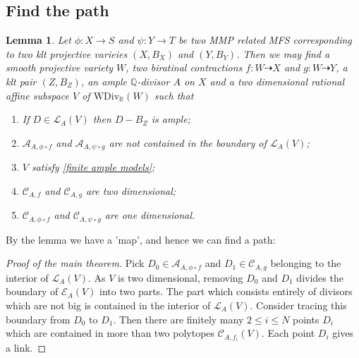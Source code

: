 \documentclass{article}
\newtheorem{lem}[defn]{Lemma}
\begin{document}
\subsection{Find the path}
\begin{lem}
	Let $ \phi:X\to S $ and $ \psi :Y\to T  $ be two MMP related MFS corresponding to two klt projective varieies $ (X,B_X) $ and $ (Y,B_Y) $. Then we may find a smooth projective variety $ W $, two biratinal contractions $ f:W\dashrightarrow X $ and $ g:W\dashrightarrow Y $, a klt pair $ (Z,B_Z) $, an ample $ \mathbb{Q} $-divisor $ A $ on $ X $ and a two dimensional rational affine subspace $ V $ of $ \mathrm{WDiv}_\mathbb{R}(W) $ such that 
	\begin{enumerate}[1)]
		\item If $ D\in \mathcal{L}_A(V) $ then $ D-B_Z $ is ample;
		\item $ \mathcal{A}_{A,\phi\circ f} $ and $ \mathcal{A}_{A,\psi\circ g} $ are not contained in the boundary of $ \mathcal{L}_A(V) $;
		\item $ V $ satisfy \ref{finite ample models};
		\item $ \mathcal{C}_{A,f} $ and $ \mathcal{C}_{A,g} $ are two dimensional;
		\item $ \mathcal{C}_{A,\phi\circ f} $ and $ \mathcal{C}_{A,\psi\circ g} $ are one dimensional.
	\end{enumerate}
\end{lem}

By the lemma we have a 'map', and hence we can find a path:

\begin{proof}[Proof of the main theorem]
	Pick $ D_0\in \mathcal{A}_{A,\phi\circ f} $  and $ D_1\in \mathcal{C}_{A,g} $ belonging to the interior of $ \mathcal{L}_A(V) $. As $ V $ is two dimensional, removing $ D_0 $ and $ D_1 $ divides the boundary of $ \mathcal{E}_A(V) $ into two parts. The part which consists entirely of divisors which are not big is contained in the interior of $ \mathcal{L}_A(V) $. Consider tracing this boundary from $ D_0 $ to $ D_1 $. Then there are finitely many $ 2\leqslant i\leqslant N $ points $ D_i $ which are contained in more than two polytopes $ \mathcal{C}_{A,f_i}(V) $. Each point $ D_i $ gives a link.
\end{proof}
\end{document}
